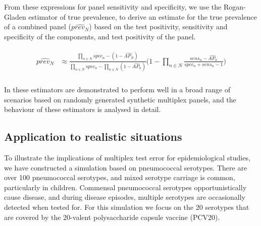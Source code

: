 \documentclass[10pt,letterpaper]{article}
\begin{document}
From these expressions for panel sensitivity and specificity, we use the Rogan-Gladen estimator of true prevalence\cite{rogan1978}, to derive an estimate for the true prevalence of a combined panel (\(\widehat{prev_N}\)) based on the test positivity, sensitivity and specificity of the components, and test positivity of the panel.

\begin{eqnarray}
\label{eq:schemeP2}
\begin{aligned}
\widehat{prev_{N}} &\approx \frac{
    \prod_{n \in N}{spec_n} -(1-\widehat{AP_{N}})
  }{
    \prod_{n \in N}{spec_n}
    -\prod_{n \in N}{(1-\widehat{AP_n})}
  } \bigg(1 - \prod_{n \in N}{ \frac{sens_n-\widehat{AP_n}}{spec_n + sens_n - 1} } \bigg ) \\
\end{aligned}
\end{eqnarray}

In  these estimators are demonstrated to perform well in a broad range of scenarios based on randomly generated synthetic multiplex panels, and the behaviour of these estimators is analysed in detail.

\subsection*{Application to realistic situations}

To illustrate the implications of multiplex test error for epidemiological studies, we have constructed a simulation based on pneumococcal serotypes. There are over 100 pneumococcal serotypes, and mixed serotype carriage is common, particularly in children. Commensal pneumococcal serotypes opportunistically cause disease, and during disease episodes, multiple serotypes are occasionally detected when tested for. For this simulation we focus on the 20 serotypes that are covered by the 20-valent polysaccharide capsule vaccine (PCV20).
\end{document}
